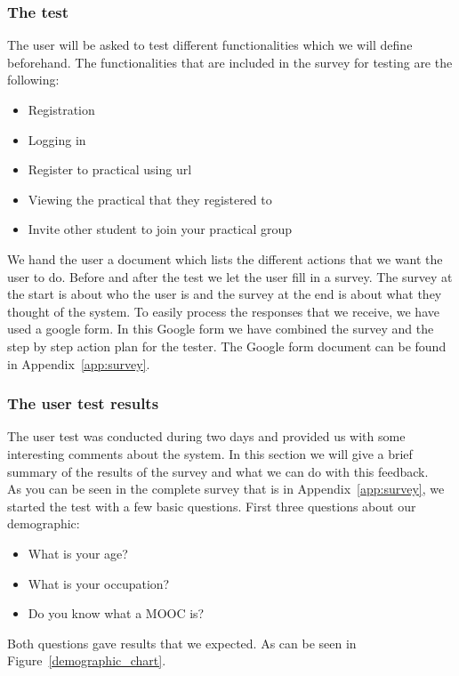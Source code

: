 \subsubsection{The test}
The user will be asked to test different functionalities which we will define beforehand.
The functionalities that are included in the survey for testing are the following:
\begin{itemize}
\item Registration
\item Logging in
\item Register to practical using url
\item Viewing the practical that they registered to
\item Invite other student to join your practical group
\end{itemize}
We hand the user a document which lists the different actions that we want the user to do.
Before and after the test we let the user fill in a survey.
The survey at the start is about who the user is and the survey at the end is about what they thought of the system.
To easily process the responses that we receive, we have used a google form.
In this Google form we have combined the survey and the step by step action plan for the tester.
The Google form document can be found in Appendix~\ref{app:survey}.

\subsubsection{The user test results}
The user test was conducted during two days and provided us with some interesting comments about the system.
In this section we will give a brief summary of the results of the survey and what we can do with this feedback.\\

As you can be seen in the complete survey that is in Appendix~\ref{app:survey}, we started the test with a few basic questions.
First three questions about our demographic:
\begin{itemize}
\item What is your age?
\item What is your occupation?
\item Do you know what a MOOC is?
\end{itemize}

Both questions gave results that we expected.
As can be seen in Figure~\ref{demographic_chart}.

